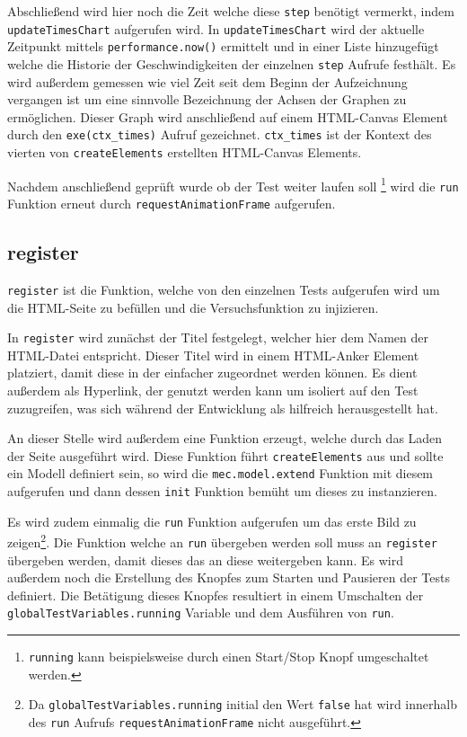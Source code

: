 Abschlie{\ss}end wird hier noch die Zeit welche diese \lstinline{step} benötigt vermerkt, indem \lstinline{updateTimesChart} aufgerufen wird.
In \lstinline{updateTimesChart} wird der aktuelle Zeitpunkt mittels \lstinline{performance.now()} %
ermittelt und in einer Liste hinzugefügt welche die Historie der Geschwindigkeiten der einzelnen \lstinline{step} Aufrufe festhält.
Es wird au{\ss}erdem gemessen wie viel Zeit seit dem Beginn der Aufzeichnung vergangen ist um eine sinnvolle Bezeichnung der Achsen der Graphen zu ermöglichen.
Dieser Graph wird anschlie{\ss}end auf einem HTML-Canvas Element durch den \lstinline{exe(ctx_times)} Aufruf gezeichnet.
\lstinline{ctx_times} ist der Kontext des vierten von \lstinline{createElements} erstellten HTML-Canvas Elements.

Nachdem anschlie{\ss}end geprüft wurde ob der Test weiter laufen soll \footnote{\lstinline{running} kann beispielsweise durch einen Start/Stop Knopf umgeschaltet werden.} wird die \lstinline{run} Funktion erneut durch \lstinline{requestAnimationFrame} aufgerufen.

\subsection{register}\label{ch:gtv_register}

\lstinline{register} ist die Funktion, welche von den einzelnen Tests aufgerufen wird um die HTML-Seite zu befüllen und die Versuchsfunktion zu injizieren.

In \lstinline{register} wird zunächst der Titel festgelegt, welcher hier dem Namen der HTML-Datei entspricht.
Dieser Titel wird in einem HTML-Anker Element %
platziert, damit diese in der  einfacher zugeordnet werden können.
Es dient au{\ss}erdem als Hyperlink, der genutzt werden kann um isoliert auf den Test zuzugreifen, was sich während der Entwicklung als hilfreich herausgestellt hat.

An dieser Stelle wird au{\ss}erdem eine Funktion erzeugt, welche durch das Laden der Seite ausgeführt wird.
Diese Funktion führt \lstinline{createElements} aus und sollte ein  Modell definiert sein, so wird die \lstinline{mec.model.extend} Funktion mit diesem aufgerufen und dann dessen \lstinline{init} Funktion bemüht um dieses zu instanzieren.

Es wird zudem einmalig die \lstinline{run} Funktion aufgerufen um das erste Bild zu zeigen\footnote{Da \lstinline{globalTestVariables.running} initial den Wert \lstinline{false} hat wird innerhalb des \lstinline{run} Aufrufs \lstinline{requestAnimationFrame} nicht ausgeführt.}.
Die Funktion welche an \lstinline{run} übergeben werden soll muss an \lstinline{register} übergeben werden, damit dieses das an diese weitergeben kann.
Es wird au{\ss}erdem noch die Erstellung des Knopfes zum Starten und Pausieren der Tests definiert.
Die Betätigung dieses Knopfes resultiert in einem Umschalten der \lstinline{globalTestVariables.running} Variable und dem Ausführen von \lstinline{run}.

